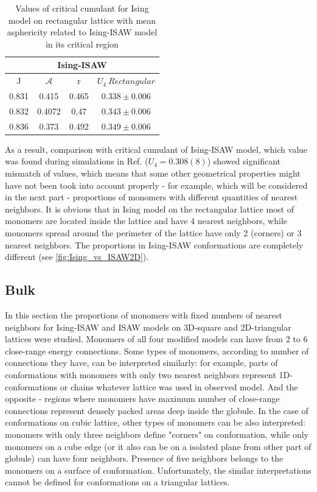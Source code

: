 \begin{table}[h]
    \centering
    \begin{tabular}{|c|c|c|c|}
        \hline
         \multicolumn{4}{|c|}{Ising-ISAW}  \\ \hline
         J & $\mathcal{A}$ & r & $U_{4}\  Rectangular$ \\ \hline
         0.831 & 0.415 & 0.465 & $0.338 \pm 0.006$\\ \hline
         0.832 & 0.4072 & 0.47 & $0.343 \pm 0.006$\\ \hline
         0.836 & 0.373 & 0.492 & $0.349 \pm 0.006$\\ \hline
         \end{tabular}
    \medskip
    \caption{Values of critical cumulant for Ising model on rectangular lattice with mean asphericity related to Ising-ISAW model in its critical region}
    \label{tab:A_r_U}
\end{table}


As a result, comparison with critical cumulant of Ising-ISAW model, which value was found during simulations in Ref.\cite{faizullina2021critical} ($U_{4} = 0.308(8)$) showed significant mismatch of values, which means that some other geometrical properties might have not been took into account properly - for example, which will be considered in the next part - proportions of monomers with different quantities of nearest neighbors. It is obvious that in Ising model on the rectangular lattice most of monomers are located inside the lattice and have 4 nearest neighbors, while monomers spread around the perimeter of the lattice have only 2 (corners) or 3 nearest neighbors. The proportions in Ising-ISAW conformations are completely different (see \cref{fig:Ising_vs_ISAW2D}).



\subsection{Bulk}

In this section the proportions of monomers with fixed numbers of nearest neighbors for Ising-ISAW and ISAW models on 3D-square and 2D-triangular lattices were studied. 
Monomers of all four modified models can have from 2 to 6 close-range energy connections. 
Some types of monomers, according to number of connections they have, can be interpreted similarly: for example, parts of conformations with monomers with only two nearest neighbors represent 1D-conformations or chains whatever lattice was used in observed model. 
And the opposite - regions where monomers have maximum number of close-range connections represent densely packed areas deep inside the globule. 
In the case of conformations on cubic lattice, other types of monomers can be also interpreted: monomers with only three neighbors define "corners" on conformation, while only monomers on a cube edge (or it also can be on a isolated plane from other part of globule) can have four neighbors. 
Presence of five neighbors belongs to the monomers on a surface of conformation. 
Unfortunately, the similar interpretations cannot be defined for conformations on a triangular lattices.

